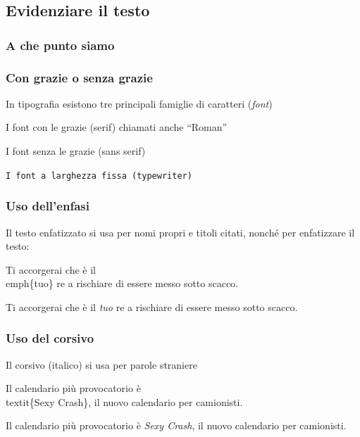 \documentclass[svgnames,%
	ucs,%
	pdftex]{guitbeamer}
\begin{document}
\subsection{Evidenziare il testo}
\begin{frame}
  \frametitle{A che punto siamo}
\end{frame}
\begin{frame}
  \frametitle{Con grazie o senza grazie}
	In tipografia esistono tre principali famiglie di caratteri (\textit{font})
	\begin{LaTeXoutput}
		\textrm{I font con le grazie (serif) chiamati anche ``Roman''}
	\end{LaTeXoutput}
	\begin{LaTeXoutput}
		\textsf{I font senza le grazie (sans serif) }
	\end{LaTeXoutput}
	\begin{LaTeXoutput}
		\texttt{I font a larghezza fissa (typewriter)}
	\end{LaTeXoutput}
\end{frame}
\begin{frame}
  \frametitle{Uso dell'enfasi}
	Il testo enfatizzato si usa per nomi propri e titoli citati, nonch\'e
	per enfatizzare il testo:
	\begin{LaTeXcode}
		Ti accorgerai che \`e il \alert{\\emph\{}tuo\alert{\}} re a
		rischiare di essere messo sotto scacco.
	\end{LaTeXcode}
	\begin{LaTeXoutput}
		Ti accorgerai che \`e il \emph{tuo} re a rischiare di essere messo
		sotto scacco.
	\end{LaTeXoutput}
\end{frame}
\begin{frame}
  \frametitle{Uso del corsivo}
	Il corsivo (italico) si usa per parole straniere
	\begin{LaTeXcode}
		Il calendario pi\`u provocatorio \`e \alert{\\textit\{}Sexy
		Crash\alert{\}}, il nuovo calendario per camionisti.
	\end{LaTeXcode}
	\begin{LaTeXoutput}
		Il calendario pi\`u provocatorio \`e \textit{Sexy Crash}, il nuovo
		calendario per camionisti.
	\end{LaTeXoutput}
\end{frame}
\end{document}
